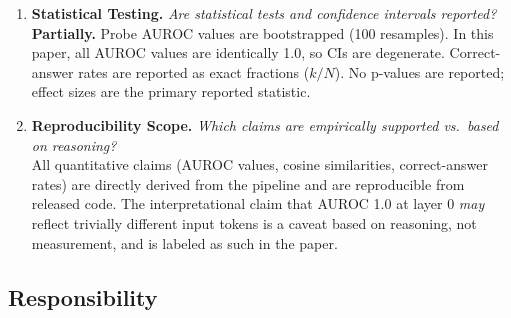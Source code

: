 \begin{enumerate}
\item \textbf{Statistical Testing.}
\textit{Are statistical tests and confidence intervals reported?} \\
\textbf{Partially.} Probe AUROC values are bootstrapped (100 resamples). In this paper, all AUROC values are identically 1.0, so CIs are degenerate. Correct-answer rates are reported as exact fractions ($k/N$). No p-values are reported; effect sizes are the primary reported statistic.

\item \textbf{Reproducibility Scope.}
\textit{Which claims are empirically supported vs.\ based on reasoning?} \\
All quantitative claims (AUROC values, cosine similarities, correct-answer rates) are directly derived from the pipeline and are reproducible from released code. The interpretational claim that AUROC 1.0 at layer 0 \emph{may} reflect trivially different input tokens is a caveat based on reasoning, not measurement, and is labeled as such in the paper.

\end{enumerate}

\subsection*{Responsibility}

